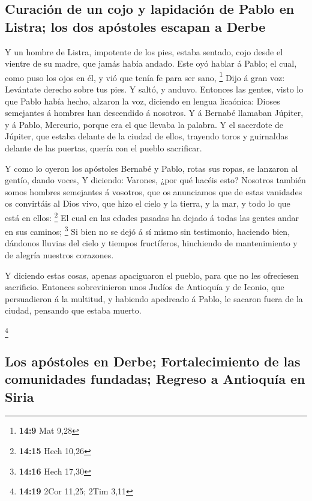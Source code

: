 \hypertarget{curaciuxf3n-de-un-cojo-y-lapidaciuxf3n-de-pablo-en-listra-los-dos-apuxf3stoles-escapan-a-derbe}{%
\subsection{Curación de un cojo y lapidación de Pablo en Listra; los dos
apóstoles escapan a
Derbe}\label{curaciuxf3n-de-un-cojo-y-lapidaciuxf3n-de-pablo-en-listra-los-dos-apuxf3stoles-escapan-a-derbe}}

 Y un hombre de Listra, impotente de los pies, estaba
sentado, cojo desde el vientre de su madre, que jamás había andado.
 Este oyó hablar á Pablo; el cual, como puso los ojos en
él, y vió que tenía fe para ser sano, \footnote{\textbf{14:9} Mat 9,28}
 Dijo á gran voz: Levántate derecho sobre tus pies. Y
saltó, y anduvo.  Entonces las gentes, visto lo que Pablo
había hecho, alzaron la voz, diciendo en lengua licaónica: Dioses
semejantes á hombres han descendido á nosotros.  Y á
Bernabé llamaban Júpiter, y á Pablo, Mercurio, porque era el que llevaba
la palabra.  Y el sacerdote de Júpiter, que estaba
delante de la ciudad de ellos, trayendo toros y guirnaldas delante de
las puertas, quería con el pueblo sacrificar.

 Y como lo oyeron los apóstoles Bernabé y Pablo, rotas
sus ropas, se lanzaron al gentío, dando voces,  Y
diciendo: Varones, ¿por qué hacéis esto? Nosotros también somos hombres
semejantes á vosotros, que os anunciamos que de estas vanidades os
convirtáis al Dios vivo, que hizo el cielo y la tierra, y la mar, y todo
lo que está en ellos: \footnote{\textbf{14:15} Hech 10,26}
 El cual en las edades pasadas ha dejado á todas las
gentes andar en sus caminos; \footnote{\textbf{14:16} Hech 17,30}
 Si bien no se dejó á sí mismo sin testimonio, haciendo
bien, dándonos lluvias del cielo y tiempos fructíferos, hinchiendo de
mantenimiento y de alegría nuestros corazones.

 Y diciendo estas cosas, apenas apaciguaron el pueblo,
para que no les ofreciesen sacrificio.  Entonces
sobrevinieron unos Judíos de Antioquía y de Iconio, que persuadieron á
la multitud, y habiendo apedreado á Pablo, le sacaron fuera de la
ciudad, pensando que estaba muerto.

\footnote{\textbf{14:19} 2Cor 11,25; 2Tim 3,11}

\hypertarget{los-apuxf3stoles-en-derbe-fortalecimiento-de-las-comunidades-fundadas-regreso-a-antioquuxeda-en-siria}{%
\subsection{Los apóstoles en Derbe; Fortalecimiento de las comunidades
fundadas; Regreso a Antioquía en
Siria}\label{los-apuxf3stoles-en-derbe-fortalecimiento-de-las-comunidades-fundadas-regreso-a-antioquuxeda-en-siria}}

